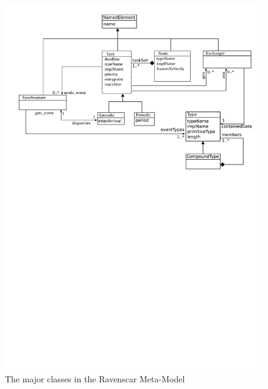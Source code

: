 \begin{figure}
\centering
\includegraphics[scale=0.6]{figs/tasking_config}
\caption{The major classes in the Ravenscar Meta-Model}
\label{fig:tasking_config}
\end{figure}

